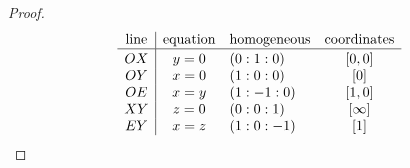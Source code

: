 \begin{proof}
    \vspace{-1.5\parskip}
    {\small
    \[
        \begin{array}{c|clc}
            {\text{line}} & \text{equation} & \text{homogeneous} &\text{coordinates}\\
            \hline\rule{0pt}{10pt}
            OX &  y=0 & (0:1:0) & [0,0]\\
            OY &  x=0 & (1:0:0) & [0]\\
            OE &  x=y & (1:-1:0) & [1,0]\\
            XY &  z=0 & (0:0:1) & [\infty]\\
            EY &  x=z & (1:0:-1) & [1]\\
        \end{array}
    \]}
\end{proof}

